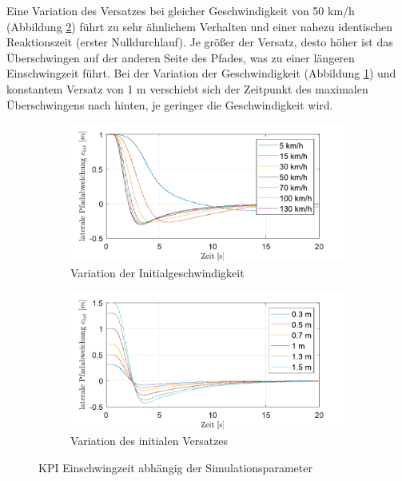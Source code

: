 \noindent Eine Variation des Versatzes bei gleicher Geschwindigkeit von 50 km/h (Abbildung \ref{fig:varOffset_50kmh_s-Error}) führt zu sehr ähnlichem Verhalten und einer nahezu identischen Reaktionszeit (erster Nulldurchlauf). Je größer der Versatz, desto höher ist das Überschwingen auf der anderen Seite des Pfades, was zu einer längeren Einschwingzeit führt. Bei der Variation der Geschwindigkeit (Abbildung \ref{fig:varVelo_1mOffset_s-Error}) und konstantem Versatz von 1 m verschiebt sich der Zeitpunkt des maximalen Überschwingens nach hinten, je geringer die Geschwindigkeit wird.
\begin{figure}[ht]
    \centering
    \begin{subfigure}[b]{.49\textwidth}
        \centering
        \includegraphics[width=\textwidth]{figures/3_Implementierung/Straight_Offset/varVelo_1mOffset_s-Error.pdf}
        \caption{Variation der Initialgeschwindigkeit}
        \label{fig:varVelo_1mOffset_s-Error}
    \end{subfigure}
    \hfill
    \begin{subfigure}[b]{.49\textwidth}
        \centering
        \includegraphics[width=\textwidth]{figures/3_Implementierung/Straight_Offset/varOffset_50kmh_s-Error.pdf}
        \caption{Variation des initialen Versatzes}
        \label{fig:varOffset_50kmh_s-Error}
    \end{subfigure}
    \caption{KPI Einschwingzeit abhängig der Simulationsparameter}
    \label{fig:Straight_Offset_s-Error}
\end{figure}

